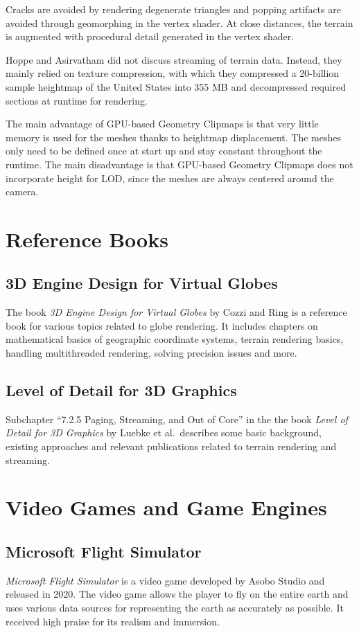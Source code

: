 Cracks are avoided by rendering degenerate triangles
and popping artifacts are avoided through geomorphing in the vertex shader.
At close distances, the terrain is augmented with procedural detail 
generated in the vertex shader.

Hoppe and Asirvatham did not discuss streaming of terrain data.
Instead, they mainly relied on texture compression,
with which they compressed a 20-billion sample heightmap of the United States
into 355 MB and decompressed required sections at runtime for rendering.

The main advantage of GPU-based Geometry Clipmaps is that very little 
memory is used for the meshes thanks to heightmap displacement. The meshes only need to be defined 
once at start up and stay constant throughout the runtime.
The main disadvantage is that GPU-based Geometry Clipmaps 
does not incorporate height for LOD,
since the meshes are always centered around the camera.

\section{Reference Books}
\subsection{3D Engine Design for Virtual Globes}
The book \textit{3D Engine Design for Virtual Globes} by Cozzi and Ring \cite{3denginedesignforvirtualglobes}
is a reference book for various topics related to globe rendering. It includes 
chapters on mathematical basics of geographic coordinate systems,
terrain rendering basics, handling multithreaded rendering, 
solving precision issues and more.

\subsection{Level of Detail for 3D Graphics}
Subchapter ``7.2.5 Paging, Streaming, and Out of Core''
in the the book \textit{Level of Detail for 3D Graphics} \cite{lodfor3dgraphics} 
by Luebke et al.~describes some basic background, existing approaches and relevant publications 
related to terrain rendering and streaming. 

\section{Video Games and Game Engines}
\subsection{Microsoft Flight Simulator}
\textit{Microsoft Flight Simulator} is a video game developed by Asobo Studio and released in 2020.
The video game allows the player to fly on the entire earth and uses various 
data sources for representing the earth as accurately as possible.
It received high praise for its realism and immersion.

